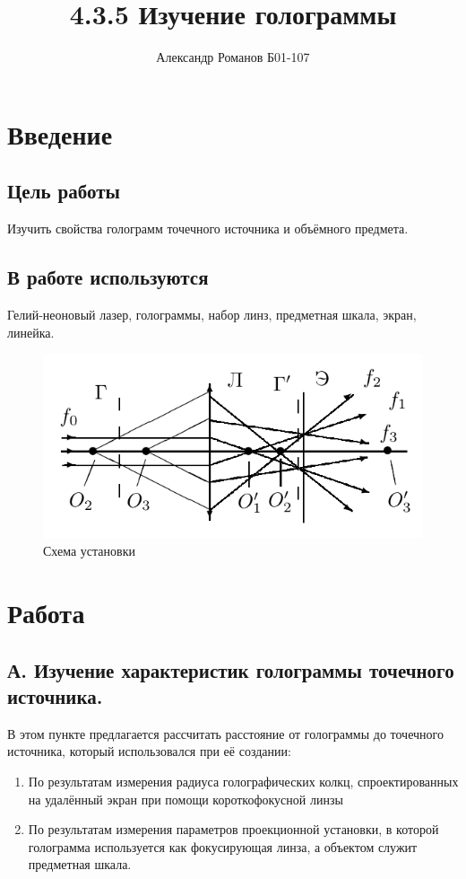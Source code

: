 \documentclass{article}
\author{Александр Романов Б01-107}
\date{}
\title{4.3.5 Изучение голограммы}
\begin{document}
\maketitle
\section{Введение}
\subsection{Цель работы}
Изучить свойства голограмм точечного источника и объёмного предмета.
\subsection{В работе используются}
Гелий-неоновый лазер, голограммы, набор линз, предметная шкала, экран, линейка.
\begin{figure}[H]
  \centering
  \includegraphics[width=\textwidth]{scheme.png}
  \caption{Схема установки}
\end{figure}
\section{Работа}

\subsection{А. Изучение характеристик голограммы точечного источника.}
В этом пункте предлагается рассчитать расстояние от голограммы до точечного источника, который использовался при её создании:
\begin{enumerate}
  \item По результатам измерения радиуса голографических колкц, спроектированных на удалённый экран при помощи
  короткофокусной линзы
  \item По результатам измерения параметров проекционной установки, в которой голограмма используется как фокусирующая линза, а объектом
  служит предметная шкала.
\end{enumerate}
\end{document}
